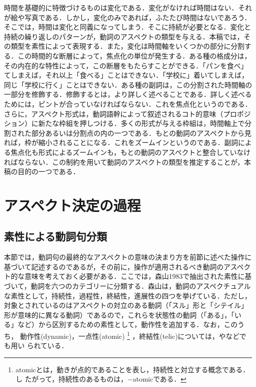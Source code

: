時間を基礎的に特徴づけるものは変化である．変化がなければ時間はない．それ
が絵や写真である．しかし，変化のみであれば，ふたたび時間はないであろう．
そこでは，時間は変化と同義になってしまう．そこに持続が必要となる．変化と
持続の繰り返しのパターンが，動詞のアスペクトの類型を与える．本稿では，そ
の類型を素性によって表現する．また，変化は時間軸をいくつかの部分に分割す
る．この時間的な断層によって，焦点化の単位が発生する．ある種の格成分は，
その内在的な特性によって，この断層をもたらすことができる．「パンを食べ」
てしまえば，それ以上「食べる」ことはできない．「学校に」着いてしまえば，
同じ「学校に行く」ことはできない．ある種の副詞は，この分割された時間軸の
一部分を修飾する．修飾するとは，より詳しく述べることである．詳しく述べる
ためには，ピントが合っていなければならない．これを焦点化というのである．
さらに，アスペクト形式は，動詞語幹によって叙述されるコト的意味（プロポジ
ション）に新たな枠組を押しつける．多くの形式が与える枠組は，時間軸上で分
割された部分あるいは分割点の内の一つである．もとの動詞のアスペクトから見
れば，枠が縮小されることになる．これをズームインというのである．副詞によ
る焦点化も形式によるズームインも，もとの動詞のアスペクトと整合していなけ
ればならない．この制約を用いて動詞のアスペクトの類型を推定することが，本
稿の目的の一つである．

\section{アスペクト決定の過程}
\subsection{素性による動詞句分類}

本節では，動詞句の最終的なアスペクトの意味の決まり方を前節に述べた操作に
基づいて記述するのであるが，その前に，操作が適用されるべき動詞のアスペク
ト的な意味を考えておく必要がある．ここでは，森山1983で抽出された素性に基
づいて，動詞を六つのカテゴリーに分類する．森山は，動詞のアスペクチュアル
な素性として，持続性，過程性，終結性，進展性の四つを挙げている．ただし，
対象とされているのはアスペクトの対立のある動詞（「スル」形と「シテイル」
形が意味的に異なる動詞）であるので，これらを状態性の動詞（「ある」，「い
る」など）から区別するための素性として，動作性を追加する．なお，このうち，
動作性(dynamic)，一点性(atomic)
\footnote{
  atomicとは，動きが点的であることを表し，持続性と対立する概念である．し
  たがって，持続性のあるものは，$-$atomicである．
}
，終結性(telic)については，\cite{Bennett90}や\cite{Dorr93}などでも用い
られている．

